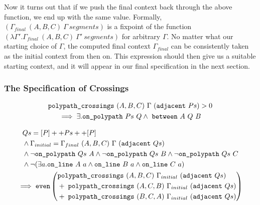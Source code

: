 Now it turns out that if we push the final context back through the above function, we end up with the same value. Formally, $(\Gamma_{final}\ (A,B,C)\ \Gamma\ segments)$ is a fixpoint of the function $(\lambda \Gamma'. \Gamma_{final}\ (A,B,C)\ \Gamma'\ segments)$ for arbitrary $\Gamma$. No matter what our starting choice of $\Gamma$, the computed final context $\Gamma_{final}$ can be consistently taken as the initial context from then on. This expression should then give us a suitable starting context, and it will appear in our final specification in the next section.

\subsubsection{The Specification of Crossings}
\begin{boxedfigure}
  \begin{multline}\label{eq:crossNZIntersect}
    \texttt{polypath\_crossings}\ (A,B,C)\ \Gamma\ (\texttt{adjacent}\ Ps) > 0\\
    \implies \exists. \texttt{on\_polypath}\ Ps\ Q \wedge\ \texttt{between}\ A\ Q\ B
  \end{multline}

  \begin{multline}\label{eq:polypathCrossingsEven}
  \begin{aligned}
    &Qs = [P] ++ Ps ++ [P]\\
    &\wedge \Gamma_{initial} = \Gamma_{final}\ (A,B,C)\ \Gamma\ (\texttt{adjacent}\ Qs)\\
    &\wedge \neg\texttt{on\_polypath}\ Qs\ A \wedge \neg\texttt{on\_polypath}\ Qs\ B \wedge \neg\texttt{on\_polypath}\ Qs\ C\\
    &\wedge \neg(\exists a.\texttt{on\_line}\ A\ a\wedge \texttt{on\_line}\ B\ a\wedge \texttt{on\_line}\ C\ a)
\end{aligned}\\
\implies\texttt{even}\left(\begin{aligned}& \texttt{polypath\_crossings}\ (A,B,C)\ \Gamma_{initial}\ (\texttt{adjacent}\ Qs)\\
    &+\;\texttt{polypath\_crossings}\ (A,C,B)\ \Gamma_{initial}\ (\texttt{adjacent}\ Qs)\\
    &+\;\texttt{polypath\_crossings}\ (B,C,A)\ \Gamma_{initial}\ (\texttt{adjacent}\ Qs)
  \end{aligned}\right)
\end{multline}


\end{boxedfigure}
